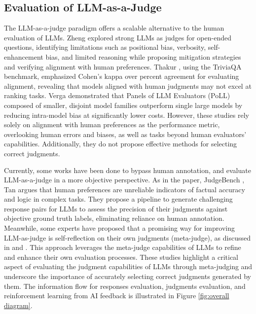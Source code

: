 \documentclass{article}
\theoremstyle{plain}
\theoremstyle{definition}
\theoremstyle{remark}
\begin{document}
\subsection{Evaluation of LLM-as-a-Judge} 
The LLM-as-a-judge paradigm offers a scalable alternative to the human evaluation of LLMs. Zheng \cite{10-zheng2023judging} explored strong LLMs as judges for open-ended questions, identifying limitations such as positional bias, verbosity, self-enhancement bias, and limited reasoning while proposing mitigation strategies and verifying alignment with human preferences. Thakur \cite{11-thakur2024judging}, using the TriviaQA benchmark, emphasized Cohen’s kappa over percent agreement for evaluating alignment, revealing that models aligned with human judgments may not excel at ranking tasks. Verga \cite{12-verga2024replacing} demonstrated that Panels of LLM Evaluators (PoLL) composed of smaller, disjoint model families outperform single large models by reducing intra-model bias at significantly lower costs.
However, these studies rely solely on alignment with human preferences as the performance metric, overlooking human errors and biases, as well as tasks beyond human evaluators' capabilities. Additionally, they do not propose effective methods for selecting correct judgments.

Currently, some works have been done to bypass human annotation, and evaluate LLM-as-a-judge in a more objective perspective.
As in the paper, JudgeBench \cite{tan2024judgebench}, Tan argues that human preferences are unreliable indicators of factual accuracy and logic in complex tasks. They propose a pipeline to generate challenging response pairs for LLMs to assess the precision of their judgments against objective ground truth labels, eliminating reliance on human annotation. 
Meanwhile, some experts have proposed that a promising way for improving LLM-as-judge is self-reflection on their own judgments (meta-judge), as discussed in \cite{14-wu2024meta} and \cite{trivedi2024self}. This approach leverages the meta-judge capabilities of LLMs to refine and enhance their own evaluation processes. 
These studies highlight a critical aspect of evaluating the judgment capabilities of LLMs through meta-judging and underscore the importance of accurately selecting correct judgments generated by them. The information flow for responses evaluation, judgments evaluation, and reinforcement learning from AI feedback is illustrated in Figure \ref{fig:overall diagram}.
\end{document}
